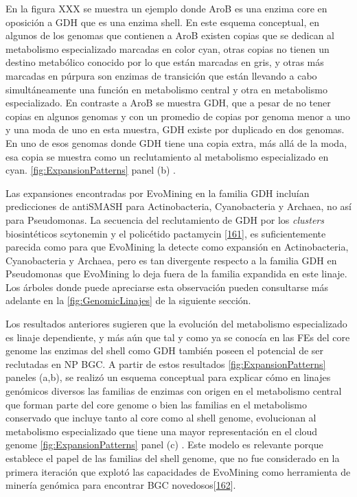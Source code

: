 \documentclass[12pt,twoside]{reedthesis}
\begin{document}
  En la figura XXX se muestra un ejemplo donde AroB es una enzima core en
  oposición a GDH que es una enzima shell. En este esquema conceptual, en
  algunos de los genomas que contienen a AroB existen copias que se
  dedican al metabolismo especializado marcadas en color cyan, otras
  copias no tienen un destino metabólico conocido por lo que están
  marcadas en gris, y otras más marcadas en púrpura son enzimas de
  transición que están llevando a cabo simultáneamente una función en
  metabolismo central y otra en metabolismo especializado. En contraste a
  AroB se muestra GDH, que a pesar de no tener copias en algunos genomas y
  con un promedio de copias por genoma menor a uno y una moda de uno en
  esta muestra, GDH existe por duplicado en dos genomas. En uno de esos
  genomas donde GDH tiene una copia extra, más allá de la moda, esa copia
  se muestra como un reclutamiento al metabolismo especializado en cyan.
  \autoref{fig:ExpansionPatterns} panel (b) .
  
  Las expansiones encontradas por EvoMining en la familia GDH incluían
  predicciones de antiSMASH para Actinobacteria, Cyanobacteria y Archaea,
  no así para Pseudomonas. La secuencia del reclutamiento de GDH por los
  \emph{clusters} biosintéticos scytonemin y el policétido pactamycin
  {[}\protect\hyperlink{ref-kudo_cloning_2007}{161}{]}, es suficientemente
  parecida como para que EvoMining la detecte como expansión en
  Actinobacteria, Cyanobacteria y Archaea, pero es tan divergente respecto
  a la familia GDH en Pseudomonas que EvoMining lo deja fuera de la
  familia expandida en este linaje. Los árboles donde puede apreciarse
  esta observación pueden consultarse más adelante en la
  \autoref{fig:GenomicLinajes} de la siguiente sección.
  
  Los resultados anteriores sugieren que la evolución del metabolismo
  especializado es linaje dependiente, y más aún que tal y como ya se
  conocía en las FEs del core genome las enzimas del shell como GDH
  también poseen el potencial de ser reclutadas en NP BGC. A partir de
  estos resultados \autoref{fig:ExpansionPatterns} paneles (a,b), se
  realizó un esquema conceptual para explicar cómo en linajes genómicos
  diversos las familias de enzimas con origen en el metabolismo central
  que forman parte del core genome o bien las familias en el metabolismo
  conservado que incluye tanto al core como al shell genome, evolucionan
  al metabolismo especializado que tiene una mayor representación en el
  cloud genome \autoref{fig:ExpansionPatterns} panel (c) . Este modelo es
  relevante porque establece el papel de las familias del shell genome,
  que no fue considerado en la primera iteración que explotó las
  capacidades de EvoMining como herramienta de minería genómica para
  encontrar BGC
  novedosos{[}\protect\hyperlink{ref-navarro-munoz_computational_2018}{162}{]}.
  
\end{document}
